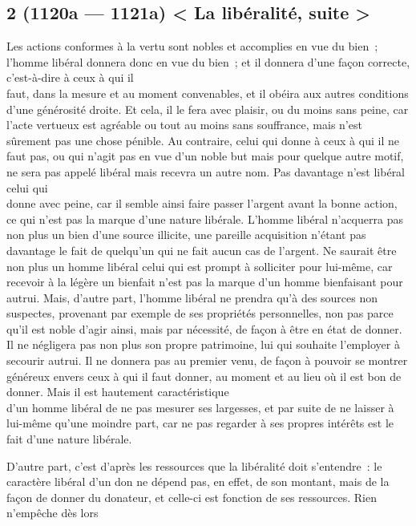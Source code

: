 \documentclass[french,twoside]{book} %
\begin{document}
\subsection[{2 (1120a — 1121a) < La libéralité, suite >}]{2 (1120a — 1121a) < La libéralité, suite >}
\noindent Les actions conformes à la vertu sont nobles et accomplies en vue du bien ; l’homme libéral donnera donc en vue du bien ; et il donnera d’une façon correcte, c’est-à-dire à ceux à qui il \\
faut, dans la mesure et au moment convenables, et il obéira aux autres conditions d’une générosité droite. Et cela, il le fera avec plaisir, ou du moins sans peine, car l’acte vertueux est agréable ou tout au moins sans souffrance, mais n’est sûrement pas une chose pénible. Au contraire, celui qui donne à ceux à qui il ne faut pas, ou qui n’agit pas en vue d’un noble but mais pour quelque autre motif, ne sera pas appelé libéral mais recevra un autre nom. Pas davantage n’est libéral celui qui \\
donne avec peine, car il semble ainsi faire passer l’argent avant la bonne action, ce qui n’est pas la marque d’une nature libérale. L’homme libéral n’acquerra pas non plus un bien d’une source illicite, une pareille acquisition n’étant pas davantage le fait de quelqu’un qui ne fait aucun cas de l’argent. Ne saurait être non plus un homme libéral celui qui est prompt à solliciter pour lui-même, car recevoir à la légère un bienfait n’est pas la marque d’un homme bienfaisant pour autrui. Mais, d’autre part, l’homme libéral ne prendra qu’à des sources non suspectes,  provenant par exemple de ses propriétés personnelles, non pas parce qu’il est noble d’agir ainsi, mais par nécessité, de façon à être en état de donner. Il ne négligera pas non plus son propre patrimoine, lui qui souhaite l’employer à secourir autrui. Il ne donnera pas au premier venu, de façon à pouvoir se montrer généreux envers ceux à qui il faut donner, au moment et au lieu où il est bon de donner. Mais il est hautement caractéristique \\
d’un homme libéral de ne pas mesurer ses largesses, et par suite de ne laisser à lui-même qu’une moindre part, car ne pas regarder à ses propres intérêts est le fait d’une nature libérale.\par
D’autre part, c’est d’après les ressources que la libéralité doit s’entendre : le caractère libéral d’un don ne dépend pas, en effet, de son montant, mais de la façon de donner du donateur, et celle-ci est fonction de ses ressources. Rien n’empêche dès lors \\
\end{document}
